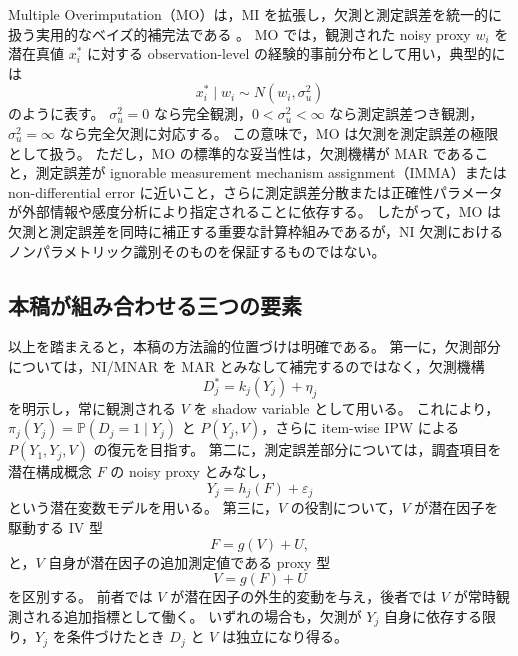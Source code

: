 \documentclass[dvipdfmx,autodetect-engine]{jsarticle}
\newcommand{\Prb}{\mathbb{P}}
\newcommand{\1}{\mathbf{1}}
\begin{document}
Multiple Overimputation（MO）は，MI を拡張し，欠測と測定誤差を統一的に扱う実用的なベイズ的補完法である \cite{BlackwellHonakerKing2017a,BlackwellHonakerKing2017b}。
MO では，観測された noisy proxy $w_i$ を潜在真値 $x_i^*$ に対する observation-level の経験的事前分布として用い，典型的には
\begin{equation}
  x_i^*\mid w_i \sim N(w_i,\sigma_u^2)
  \label{eq:background-mo-prior}
\end{equation}
のように表す。
$\sigma_u^2=0$ なら完全観測，$0<\sigma_u^2<\infty$ なら測定誤差つき観測，$\sigma_u^2=\infty$ なら完全欠測に対応する。
この意味で，MO は欠測を測定誤差の極限として扱う。
ただし，MO の標準的な妥当性は，欠測機構が MAR であること，測定誤差が ignorable measurement mechanism assignment（IMMA）または non-differential error に近いこと，さらに測定誤差分散または正確性パラメータが外部情報や感度分析により指定されることに依存する。
したがって，MO は欠測と測定誤差を同時に補正する重要な計算枠組みであるが，NI 欠測におけるノンパラメトリック識別そのものを保証するものではない。

\subsection{本稿が組み合わせる三つの要素}

以上を踏まえると，本稿の方法論的位置づけは明確である。
第一に，欠測部分については，NI/MNAR を MAR とみなして補完するのではなく，欠測機構
\begin{equation}
  D_j^*=k_j(Y_j)+\eta_j
\end{equation}
を明示し，常に観測される $V$ を shadow variable として用いる。
これにより，$\pi_j(Y_j)=\Prb(D_j=1\mid Y_j)$ と $P(Y_j,V)$，さらに item-wise IPW による $P(Y_1,Y_j,V)$ の復元を目指す。
第二に，測定誤差部分については，調査項目を潜在構成概念 $F$ の noisy proxy とみなし，
\begin{equation}
  Y_j=h_j(F)+\varepsilon_j
\end{equation}
という潜在変数モデルを用いる。
第三に，$V$ の役割について，$V$ が潜在因子を駆動する IV 型
\begin{equation}
  F=g(V)+U,
  \label{eq:iv-latent}
\end{equation}
と，$V$ 自身が潜在因子の追加測定値である proxy 型
\begin{equation}
  V=g(F)+U
  \label{eq:proxy-latent}
\end{equation}
を区別する。
前者では $V$ が潜在因子の外生的変動を与え，後者では $V$ が常時観測される追加指標として働く。
いずれの場合も，欠測が $Y_j$ 自身に依存する限り，$Y_j$ を条件づけたとき $D_j$ と $V$ は独立になり得る。
\end{document}
